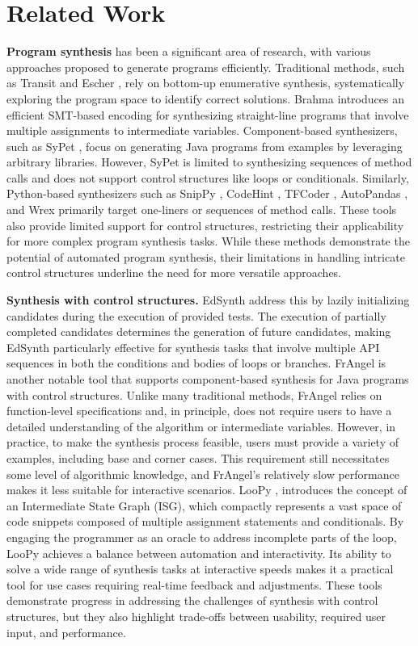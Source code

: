 \section{Related Work}
\textbf{Program synthesis} has been a significant area of research, with various approaches proposed to generate programs efficiently. Traditional methods, such as Transit \cite{transit} and Escher \cite{escher}, rely on bottom-up enumerative synthesis, systematically exploring the program space to identify correct solutions. Brahma \cite{loopfree} introduces an efficient SMT-based encoding for synthesizing straight-line programs that involve multiple assignments to intermediate variables. Component-based synthesizers, such as SyPet \cite{sypet}, focus on generating Java programs from examples by leveraging arbitrary libraries. However, SyPet is limited to synthesizing sequences of method calls and does not support control structures like loops or conditionals. Similarly, Python-based synthesizers such as SnipPy \cite{snippy}, CodeHint \cite{codehint}, TFCoder \cite{tfcoder}, AutoPandas \cite{autopandas}, and Wrex \cite{wrex} primarily target one-liners or sequences of method calls. These tools also provide limited support for control structures, restricting their applicability for more complex program synthesis tasks. While these methods demonstrate the potential of automated program synthesis, their limitations in handling intricate control structures underline the need for more versatile approaches.

\textbf{Synthesis with control structures.} EdSynth \cite{Edsynth} address this by lazily initializing candidates during the execution of provided tests. The execution of partially completed candidates determines the generation of future candidates, making EdSynth particularly effective for synthesis tasks that involve multiple API sequences in both the conditions and bodies of loops or branches.
FrAngel \cite{frangel} is another notable tool that supports component-based synthesis for Java programs with control structures. Unlike many traditional methods, FrAngel relies on function-level specifications and, in principle, does not require users to have a detailed understanding of the algorithm or intermediate variables. However, in practice, to make the synthesis process feasible, users must provide a variety of examples, including base and corner cases. This requirement still necessitates some level of algorithmic knowledge, and FrAngel’s relatively slow performance makes it less suitable for interactive scenarios.
LooPy \cite{loopy}, introduces the concept of an Intermediate State Graph (ISG), which compactly represents a vast space of code snippets composed of multiple assignment statements and conditionals. By engaging the programmer as an oracle to address incomplete parts of the loop, LooPy achieves a balance between automation and interactivity. Its ability to solve a wide range of synthesis tasks at interactive speeds makes it a practical tool for use cases requiring real-time feedback and adjustments.
These tools demonstrate progress in addressing the challenges of synthesis with control structures, but they also highlight trade-offs between usability, required user input, and performance.

